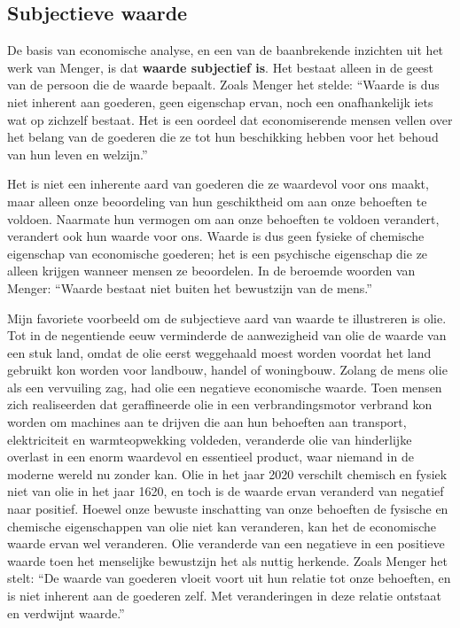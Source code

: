 \subsection{Subjectieve waarde}

De basis van economische analyse, en een van de baanbrekende inzichten uit het werk van Menger, is dat \textbf{waarde subjectief is}. Het bestaat alleen in de geest van de persoon die de waarde bepaalt. Zoals Menger het stelde: “Waarde is dus niet inherent aan goederen, geen eigenschap ervan, noch een onafhankelijk iets wat op zichzelf bestaat. Het is een oordeel dat economiserende mensen vellen over het belang van de goederen die ze tot hun beschikking hebben voor het behoud van hun leven en welzijn.”\autocite{17}

Het is niet een inherente aard van goederen die ze waardevol voor ons maakt, maar alleen onze beoordeling van hun geschiktheid om aan onze behoeften te voldoen. Naarmate hun vermogen om aan onze behoeften te voldoen verandert, verandert ook hun waarde voor ons. Waarde is dus geen fysieke of chemische eigenschap van economische goederen; het is een psychische eigenschap die ze alleen krijgen wanneer mensen ze beoordelen. In de beroemde woorden van Menger: “Waarde bestaat niet buiten het bewustzijn van de mens.”\autocite{18}

Mijn favoriete voorbeeld om de subjectieve aard van waarde te illustreren is olie. Tot in de negentiende eeuw verminderde de aanwezigheid van olie de waarde van een stuk land, omdat de olie eerst weggehaald moest worden voordat het land gebruikt kon worden voor landbouw, handel of woningbouw. Zolang de mens olie als een vervuiling zag, had olie een negatieve economische waarde. Toen mensen zich realiseerden dat geraffineerde olie in een verbrandingsmotor verbrand kon worden om machines aan te drijven die aan hun behoeften aan transport, elektriciteit en warmteopwekking voldeden, veranderde olie van hinderlijke overlast in een enorm waardevol en essentieel product, waar niemand in de moderne wereld nu zonder kan. Olie in het jaar 2020 verschilt chemisch en fysiek niet van olie in het jaar 1620, en toch is de waarde ervan veranderd van negatief naar positief. Hoewel onze bewuste inschatting van onze behoeften de fysische en chemische eigenschappen van olie niet kan veranderen, kan het de economische waarde ervan wel veranderen. Olie veranderde van een negatieve in een positieve waarde toen het menselijke bewustzijn het als nuttig herkende. Zoals Menger het stelt: “De waarde van goederen vloeit voort uit hun relatie tot onze behoeften, en is niet inherent aan de goederen zelf. Met veranderingen in deze relatie ontstaat en verdwijnt waarde.”\autocite{19}

